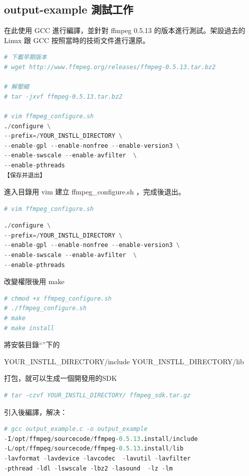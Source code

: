 \documentclass[10pt,UTF8]{ctexart}
\begin{document}
\subsection{output-example 測試工作}

在此使用 GCC 進行編譯，並針對 ffmpeg 0.5.13 的版本進行測試。架設過去的 Linux 跟 GCC 按照當時的技術文件進行還原。

\begin{lstlisting}[language={python}]
# 下載早期版本
# wget http://www.ffmpeg.org/releases/ffmpeg-0.5.13.tar.bz2

# 解壓縮
# tar -jxvf ffmpeg-0.5.13.tar.bz2

# vim ffmpeg_configure.sh
./configure \
--prefix=/YOUR_INSTLL_DIRECTORY \
--enable-gpl --enable-nonfree --enable-version3 \
--enable-swscale --enable-avfilter  \
--enable-pthreads
【保存并退出】

\end{lstlisting}

進入目錄用 vim 建立 ffmpeg\_configure.sh ，完成後退出。

\begin{lstlisting}[language={python}]
# vim ffmpeg_configure.sh
\end{lstlisting}

\begin{lstlisting}[language={python}]
./configure \
--prefix=/YOUR_INSTLL_DIRECTORY \
--enable-gpl --enable-nonfree --enable-version3 \
--enable-swscale --enable-avfilter  \
--enable-pthreads
\end{lstlisting}

改變權限後用 make 

\begin{lstlisting}[language={python}]
# chmod +x ffmpeg_configure.sh
# ./ffmpeg_configure.sh
# make
# make install
\end{lstlisting}

將安裝目錄“”下的 

YOUR\_INSTLL\_DIRECTORY/include
YOUR\_INSTLL\_DIRECTORY/lib

打包，就可以生成一個開發用的SDK

\begin{lstlisting}[language={python}]
# tar -czvf YOUR_INSTLL_DIRECTORY/ ffmpeg_sdk.tar.gz
\end{lstlisting}

引入後編譯，解决：

\begin{lstlisting}[language={python}]
# gcc output_example.c -o output_example 
-I/opt/ffmpeg/sourcecode/ffmpeg-0.5.13.install/include 
-L/opt/ffmpeg/sourcecode/ffmpeg-0.5.13.install/lib  
-lavformat -lavdevice -lavcodec  -lavutil -lavfilter 
-pthread -ldl -lswscale -lbz2 -lasound  -lz -lm
\end{lstlisting}
\end{document}
